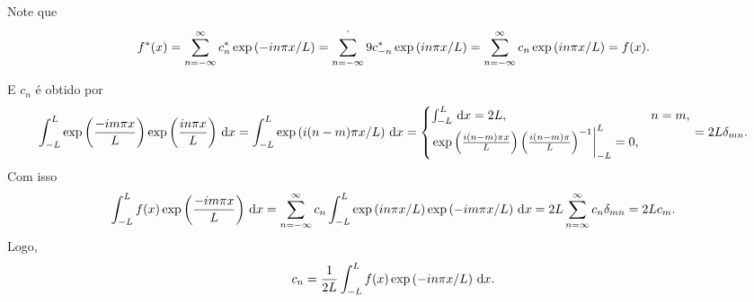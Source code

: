 \begin{obs}
  Note que
  \begin{dmath*}
    f^*(x) = \sum_{n = -\infty}^\infty c_n^* \exp\left( -i n \pi x / L \right)
    = \sum_{n = -\infty}^`9 c_{-n}^* \exp\left( i n \pi x / L \right)
    = \sum_{n = -\infty}^\infty c_n \exp\left( i n \pi x / L \right)
    = f(x).
  \end{dmath*}
\end{obs}

E $c_n$ é obtido por
\begin{dmath*}
  \int_{-L}^L \exp\left( \frac{-i m \pi x}{L} \right) \exp\left( \frac{i n \pi
  x}{L} \right)
  \vi{x} = \int_{-L}^L \exp\left( i (n - m) \pi x / L \right) \vi{x}
  = \begin{cases}
    \int_{-L}^L \vi{x} = 2 L, & n = m, \\
    \left. \exp\left( \frac{i (n - m) \pi x}{L} \right) \left( \frac{i (n - m)
    \pi}{L} \right)^{-1} \right\vert_{-L}^L = 0,
  \end{cases}
  = 2 L \delta_{mn}.
\end{dmath*}
Com isso
\begin{dmath*}
  \int_{-L}^L f(x) \exp\left( \frac{-i m \pi x}{L} \right) \vi{x} = \sum_{n =
  -\infty}^{\infty} c_n \int_{-L}^L \exp\left( i n \pi x / L \right) \exp\left( -i
  m \pi x / L \right) \vi{x}
  = 2 L \sum_{n = \infty}^{\infty} c_n \delta_{mn}
  = 2 L c_m.
\end{dmath*}
Logo,
\begin{dmath*}
  c_n = \frac{1}{2L} \int_{-L}^L f(x) \exp\left( -i n \pi x / L \right) \vi{x}.
\end{dmath*}

